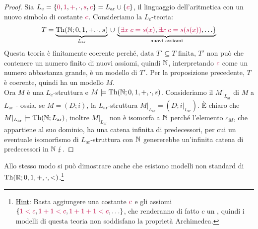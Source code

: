 \begin{proof}
    Sia $L_{\text{c}} = \{\textcolor{purple}{0}, \textcolor{purple}{1}, \textcolor{purple}{+}, \textcolor{purple}{\cdot}, \textcolor{purple}{s}, \textcolor{purple}{c}\} = L_{\text{ar}} \cup \{\textcolor{purple}{c}\}$, il linguaggio dell'aritmetica 
    con un nuovo simbolo di costante $\textcolor{purple}{c}$. Consideriamo la $L_{\text{c}}$-teoria:
    \[ T = \underbrace{\operatorname{Th}(\mathbb N;0,1,+,\cdot,s)}_{L_\text{ar}} \,\cup\, \underbrace{\{\textcolor{purple}{\exists x \; c = s(x)}, \textcolor{purple}{\exists x \; c = s(s(x))}, \ldots\}}_{\text{nuovi assiomi}}
    \]
    Questa teoria è finitamente coerente perché, data $T' \subseteq T$ finita, $T'$ non può che contenere un numero finito di nuovi assiomi, quindi $\mathbb N$, interpretando $\textcolor{purple}{c}$ come un numero abbastanza grande, è un modello di $T'$. Per la proposizione precedente, $T$ è coerente, quindi ha un modello $M$.\\
    Ora $M$ è una $L_{\text{c}}$-struttura e $M \models \operatorname{Th}(\mathbb N;0,1,+,\cdot,s)$. Consideriamo il  $M|_{L_{\text{ar}}}$ di $M$ a $L_{\text{ar}}$ - ossia, se $M = (D;i)$, la $L_{\text{ar}}$-struttura $M|_{L_{\text{ar}}} = (D;i|_{L_{\text{ar}}})$. È chiaro che $M|_{L_{\text{ar}}} \models \operatorname{Th}(\mathbb N;L_{\text{ar}})$,
    inoltre $M|_{L_{\text{ar}}}$ non è isomorfa a $\mathbb N$ perché l'elemento $c_M$, che appartiene al suo dominio, ha una catena infinita di predecessori, per cui un eventuale isomorfismo di $L_{\text{ar}}$-struttura con $\mathbb N$ genererebbe un'infinita catena di predecessori in $\mathbb N \; \lightning$.
\end{proof}

\begin{exercise}
    Allo stesso modo si può dimostrare anche che esistono modelli non standard di $\operatorname{Th}(\mathbb R; 0,1,+,\cdot,<)$.\footnote{\underline{Hint}: Basta aggiungere una costante $\textcolor{purple}{c}$ e gli assiomi $\{\textcolor{purple}{1 < c}, \textcolor{purple}{1 + 1 < c}, \textcolor{purple}{1 + 1 + 1 < c}, \ldots\}$, che renderanno di fatto $c$ un ,
    quindi i modelli di questa teoria non soddisfano la proprietà Archimedea.}
\end{exercise}


